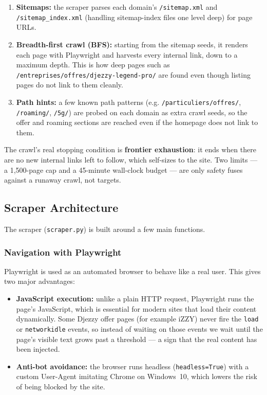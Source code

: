 \documentclass[12pt, a4paper]{report}
\newcommand{\humantext}[1]{#1}      %
\begin{document}
\begin{enumerate}
    \item \humantext{\textbf{Sitemaps:} the scraper parses each domain's \texttt{/sitemap.xml} and \texttt{/sitemap\_index.xml} (handling sitemap-index files one level deep) for page URLs.}
    \item \humantext{\textbf{Breadth-first crawl (BFS):} starting from the sitemap seeds, it renders each page with Playwright and harvests every internal link, down to a maximum depth. This is how deep pages such as \texttt{/entreprises/offres/djezzy-legend-pro/} are found even though listing pages do not link to them cleanly.}
    \item \humantext{\textbf{Path hints:} a few known path patterns (e.g. \texttt{/particuliers/offres/}, \texttt{/roaming/}, \texttt{/5g/}) are probed on each domain as extra crawl seeds, so the offer and roaming sections are reached even if the homepage does not link to them.}
\end{enumerate}

\humantext{The crawl's real stopping condition is \textbf{frontier exhaustion}: it ends when there are no new internal links left to follow, which self-sizes to the site. Two limits --- a 1{,}500-page cap and a 45-minute wall-clock budget --- are only safety fuses against a runaway crawl, not targets.}

\subsection{Scraper Architecture}
\humantext{The scraper (\texttt{scraper.py}) is built around a few main functions.}

\subsubsection{Navigation with Playwright}
\humantext{Playwright is used as an automated browser to behave like a real user. This gives two major advantages:}
\begin{itemize}[noitemsep]
    \item \humantext{\textbf{JavaScript execution:} unlike a plain HTTP request, Playwright runs the page's JavaScript, which is essential for modern sites that load their content dynamically. Some Djezzy offer pages (for example iZZY) never fire the \texttt{load} or \texttt{networkidle} events, so instead of waiting on those events we wait until the page's visible text grows past a threshold --- a sign that the real content has been injected.}
    \item \humantext{\textbf{Anti-bot avoidance:} the browser runs headless (\texttt{headless=True}) with a custom User-Agent imitating Chrome on Windows~10, which lowers the risk of being blocked by the site.}
\end{itemize}
\end{document}
